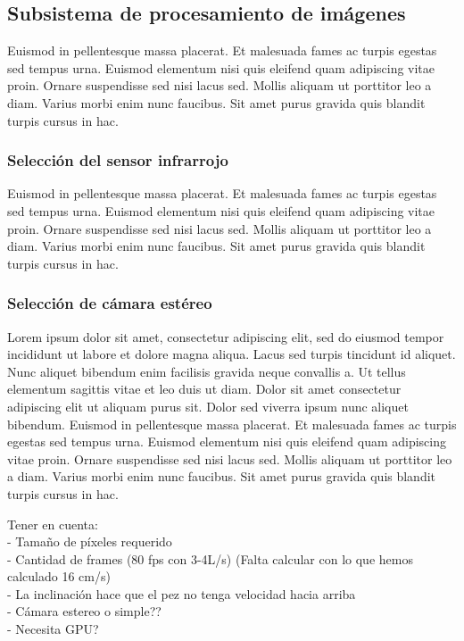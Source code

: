 \subsection{Subsistema de procesamiento de imágenes}

Euismod in pellentesque massa placerat. Et malesuada fames ac turpis egestas sed tempus urna. Euismod elementum nisi quis eleifend quam adipiscing vitae proin. Ornare suspendisse sed nisi lacus sed. Mollis aliquam ut porttitor leo a diam. Varius morbi enim nunc faucibus. Sit amet purus gravida quis blandit turpis cursus in hac.

\subsubsection{Selección del sensor infrarrojo}

Euismod in pellentesque massa placerat. Et malesuada fames ac turpis egestas sed tempus urna. Euismod elementum nisi quis eleifend quam adipiscing vitae proin. Ornare suspendisse sed nisi lacus sed. Mollis aliquam ut porttitor leo a diam. Varius morbi enim nunc faucibus. Sit amet purus gravida quis blandit turpis cursus in hac.


\subsubsection{Selección de cámara estéreo} %

Lorem ipsum dolor sit amet, consectetur adipiscing elit, sed do eiusmod tempor incididunt ut labore et dolore magna aliqua. Lacus sed turpis tincidunt id aliquet. Nunc aliquet bibendum enim facilisis gravida neque convallis a. Ut tellus elementum sagittis vitae et leo duis ut diam. Dolor sit amet consectetur adipiscing elit ut aliquam purus sit. Dolor sed viverra ipsum nunc aliquet bibendum. Euismod in pellentesque massa placerat. Et malesuada fames ac turpis egestas sed tempus urna. Euismod elementum nisi quis eleifend quam adipiscing vitae proin. Ornare suspendisse sed nisi lacus sed. Mollis aliquam ut porttitor leo a diam. Varius morbi enim nunc faucibus. Sit amet purus gravida quis blandit turpis cursus in hac.

Tener en cuenta: \\
- Tamaño de píxeles requerido \\
- Cantidad de frames (80 fps con 3-4L/s) (Falta calcular con lo que hemos calculado 16 cm/s) \\ 
- La inclinación hace que el pez no tenga velocidad hacia arriba \\
- Cámara estereo o simple?? \\
- Necesita GPU? \\


